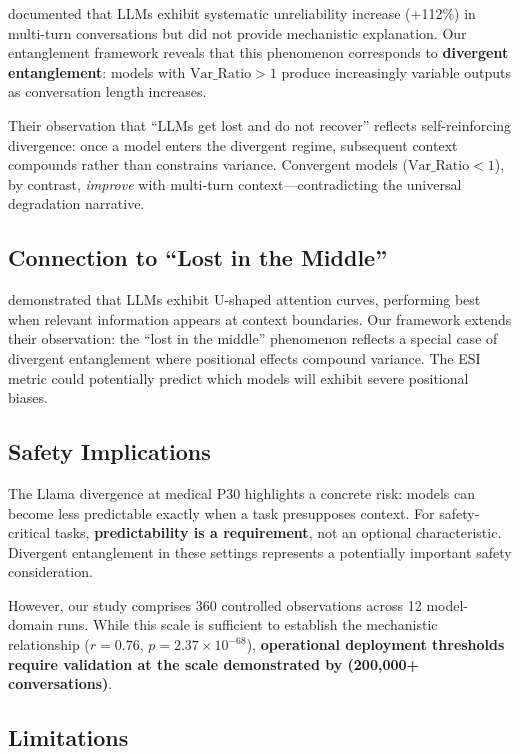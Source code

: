 \documentclass[twoside,11pt]{article}
\begin{document}
\citet{laban2025lost} documented that LLMs exhibit systematic unreliability increase (+112\%) in multi-turn conversations but did not provide mechanistic explanation. Our entanglement framework reveals that this phenomenon corresponds to \textbf{divergent entanglement}: models with $\text{Var\_Ratio} > 1$ produce increasingly variable outputs as conversation length increases.

Their observation that ``LLMs get lost and do not recover'' reflects self-reinforcing divergence: once a model enters the divergent regime, subsequent context compounds rather than constrains variance. Convergent models ($\text{Var\_Ratio} < 1$), by contrast, \emph{improve} with multi-turn context---contradicting the universal degradation narrative.

\subsection{Connection to ``Lost in the Middle''}

\citet{liu2024lost} demonstrated that LLMs exhibit U-shaped attention curves, performing best when relevant information appears at context boundaries. Our framework extends their observation: the ``lost in the middle'' phenomenon reflects a special case of divergent entanglement where positional effects compound variance. The ESI metric could potentially predict which models will exhibit severe positional biases.

\subsection{Safety Implications}

The Llama divergence at medical P30 highlights a concrete risk: models can become less predictable exactly when a task presupposes context. For safety-critical tasks, \textbf{predictability is a requirement}, not an optional characteristic. Divergent entanglement in these settings represents a potentially important safety consideration.

However, our study comprises 360 controlled observations across 12 model-domain runs. While this scale is sufficient to establish the mechanistic relationship ($r = 0.76$, $p = 2.37 \times 10^{-68}$), \textbf{operational deployment thresholds require validation at the scale demonstrated by \citet{laban2025lost} (200,000+ conversations)}.

\subsection{Limitations}
\end{document}
